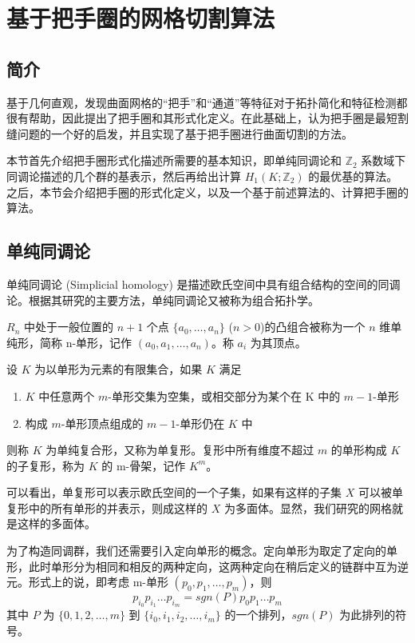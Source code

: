 
\chapter{基于把手圈的网格切割算法}

\section{简介}

\citet{oncomputinghantun} 基于几何直观，发现曲面网格的“把手”和“通道”等特征对于拓扑简化和特征检测都很有帮助，因此提出了把手圈和其形式化定义。在此基础上，\citet{Chai2018}认为把手圈是最短割缝问题的一个好的启发，并且实现了基于把手圈进行曲面切割的方法。

本节首先介绍把手圈形式化描述所需要的基本知识，即单纯同调论和 $ \mathbb{Z}_2 $ 系数域下同调论描述的几个群的基表示，然后再给出计算 $ H_1(K; \mathbb{Z}_2) $ 的最优基的算法。之后，本节会介绍把手圈的形式化定义，以及一个基于前述算法的、计算把手圈的算法。

\section{单纯同调论}

单纯同调论 (Simplicial homology) 是描述欧氏空间中具有组合结构的空间的同调论。根据其研究的主要方法，单纯同调论又被称为组合拓扑学。

$ R_n $ 中处于一般位置的 $ n + 1 $ 个点 $ \{a_0, \dots, a_n\} $ ($n > 0$)的凸组合被称为一个 $ n $ 维单纯形，简称 n-单形，记作 $ (a_0, a_1, \dots, a_n) $。称 $ a_i$ 为其顶点。

设 $ K $ 为以单形为元素的有限集合，如果 $ K $ 满足
\begin{enumerate}
    \item $ K $ 中任意两个 $m$-单形交集为空集，或相交部分为某个在 K 中的 $m-1$-单形
    \item 构成 $ m$-单形顶点组成的 $ m - 1 $-单形仍在 $ K $ 中
\end{enumerate}
则称 $ K $ 为单纯复合形，又称为单复形。复形中所有维度不超过 $ m $ 的单形构成 $ K $ 的子复形，称为 $ K $ 的 m-骨架，记作 $ K^m $。

可以看出，单复形可以表示欧氏空间的一个子集，如果有这样的子集 $ X $ 可以被单复形中的所有单形的并表示，则成这样的 $ X $ 为多面体。显然，我们研究的网格就是这样的多面体。

为了构造同调群，我们还需要引入定向单形的概念。定向单形为取定了定向的单形，此时单形分为相同和相反的两种定向，这两种定向在稍后定义的链群中互为逆元。形式上的说，即考虑 m-单形 $ (p_0, p_1, \dots, p_m) $，则 
$$ p_{i_0} p_{i_1} \dots p_{i_m} = sgn(P) p_{0} p_{1} \dots p_{m} $$
其中 $ P $ 为 $ \{0, 1, 2, \dots, m \} $ 到 $ \{i_0, i_1, i_2, \dots, i_m \} $ 的一个排列，$ sgn(P) $ 为此排列的符号。

